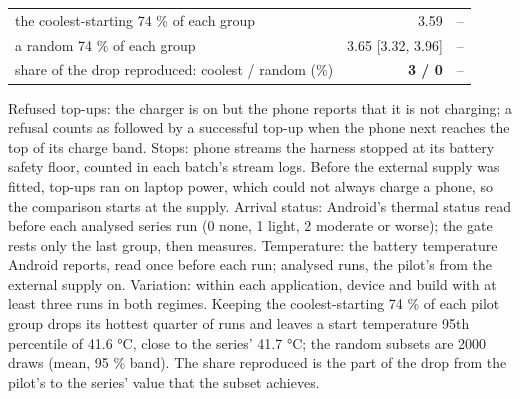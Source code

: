 \begin{table}[t]
\begin{tabular}{lrr}
the coolest-starting 74 \% of each group & 3.59 & – \\
a random 74 \% of each group & 3.65 [3.32, 3.96] & – \\
share of the drop reproduced: coolest / random (\%) & \textbf{3 / 0} & – \\
\bottomrule
\end{tabular}
\par\smallskip\footnotesize Refused top-ups: the charger is on but the phone reports that it is not charging; a refusal counts as followed by a successful top-up when the phone next reaches the top of its charge band. Stops: phone streams the harness stopped at its battery safety floor, counted in each batch's stream logs. Before the external supply was fitted, top-ups ran on laptop power, which could not always charge a phone, so the comparison starts at the supply. Arrival status: Android's thermal status read before each analysed series run (0 none, 1 light, 2 moderate or worse); the gate rests only the last group, then measures. Temperature: the battery temperature Android reports, read once before each run; analysed runs, the pilot's from the external supply on. Variation: within each application, device and build with at least three runs in both regimes. Keeping the coolest-starting 74 \% of each pilot group drops its hottest quarter of runs and leaves a start temperature 95th percentile of 41.6 °C, close to the series' 41.7 °C; the random subsets are 2000 draws (mean, 95 \% band). The share reproduced is the part of the drop from the pilot's to the series' value that the subset achieves.
\end{table}
